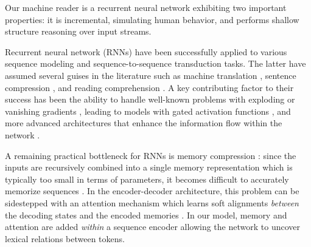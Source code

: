 \documentclass[11pt,letterpaper]{article}
\begin{document}
        Our machine reader is a recurrent neural network exhibiting
        two important properties: it is incremental, simulating human
        behavior, and performs shallow structure reasoning over input
        streams.  

        Recurrent neural network (RNNs) have been successfully applied
        to various sequence modeling and sequence-to-sequence
        transduction tasks. The latter have assumed several guises in
        the literature such as machine translation
        \cite{bahdanau2014neural}, sentence compression
        \cite{rush2015neural}, and reading comprehension
        \cite{hermann2015teaching}.  A key contributing factor to
        their success has been the ability to handle well-known
        problems with exploding or vanishing gradients
        \cite{bengio1994learning},  leading to models with
        gated activation functions
        \cite{hochreiter1997long,cho2014learning}, and more advanced
        architectures that enhance the information flow within the
        network
        \cite{koutnik2014clockwork,chung2015gated,yao2015depth}.
        
        A remaining practical bottleneck for RNNs is memory
        compression \cite{bahdanau2014neural}: since the inputs are
        recursively combined into a single memory representation which
        is typically too small in terms of parameters, it becomes
        difficult to accurately memorize sequences
        \cite{zaremba2014learning}. In the encoder-decoder
        architecture, this problem can be sidestepped with an
        attention mechanism which learns soft alignments
        \textit{between} the decoding states and the encoded memories
        \cite{bahdanau2014neural}. In our model, memory and attention
        are added \textit{within} a sequence encoder allowing the
        network to uncover lexical relations between tokens.
\end{document}
